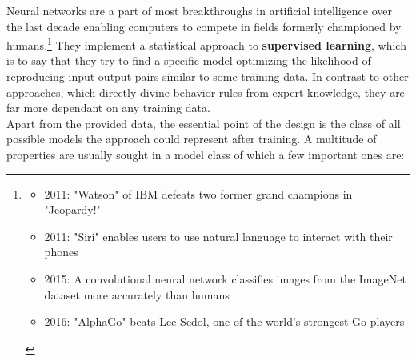 Neural networks are a part of most breakthroughs in artificial intelligence over the last decade enabling computers to
compete in fields formerly championed by humans.\footnote{\begin{itemize}[topsep=0pt]
		\item 
		2011: "Watson" of IBM defeats two former grand champions in "Jeopardy!" \cite{lally2011natural}
		\item 
		2011: "Siri" enables users to use natural language to interact with their phones
		\cite{ARON201124}
		\item 
		2015: A convolutional neural network classifies images from the ImageNet dataset more accurately than humans 
		\cite{Russakovsky2015} \cite{He_2015_ICCV}
		\item 
		2016: "AlphaGo" beats Lee Sedol, one of the world's strongest Go players
		\cite{gibney2016google} \cite{silver2017mastering}
	\end{itemize}
} They implement a statistical approach to \textbf{supervised learning},
which is to say that they try to find a specific model optimizing the likelihood of reproducing input-output pairs similar to some training data. In contrast to other approaches, which directly divine behavior rules from expert knowledge, they are far more dependant on any training data.\cite{Statistical-ML-Basics}\\
Apart from the provided data, the essential point of the design is the class of all possible models the approach could represent after training. A multitude of properties are usually sought in a model class of which a few important ones are:
